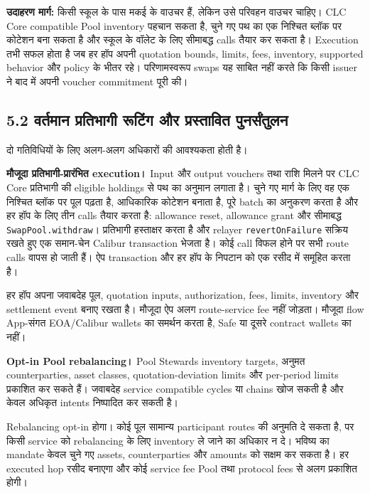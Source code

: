 \documentclass[11pt]{article}
\begin{document}
\textbf{उदाहरण मार्ग:} किसी स्कूल के पास मकई के वाउचर हैं, लेकिन उसे परिवहन वाउचर चाहिए। CLC Core compatible Pool inventory पहचान सकता है, चुने गए पथ का एक निश्चित ब्लॉक पर कोटेशन बना सकता है और स्कूल के वॉलेट के लिए सीमाबद्ध calls तैयार कर सकता है। Execution तभी सफल होता है जब हर हॉप अपनी quotation bounds, limits, fees, inventory, supported behavior और policy के भीतर रहे। परिणामस्वरूप swaps यह साबित नहीं करते कि किसी issuer ने बाद में अपनी voucher commitment पूरी की।

\subsection*{5.2 वर्तमान प्रतिभागी रूटिंग और प्रस्तावित पुनर्संतुलन}

दो गतिविधियों के लिए अलग-अलग अधिकारों की आवश्यकता होती है।

\textbf{मौजूदा प्रतिभागी-प्रारंभित execution।} Input और output vouchers तथा राशि मिलने पर CLC Core प्रतिभागी की eligible holdings से पथ का अनुमान लगाता है। चुने गए मार्ग के लिए वह एक निश्चित ब्लॉक पर पूल पढ़ता है, आधिकारिक कोटेशन बनाता है, पूरे batch का अनुकरण करता है और हर हॉप के लिए तीन calls तैयार करता है: allowance reset, allowance grant और सीमाबद्ध \texttt{SwapPool.withdraw}। प्रतिभागी हस्ताक्षर करता है और relayer \texttt{revertOnFailure} सक्रिय रखते हुए एक समान-चेन Calibur transaction भेजता है। कोई call विफल होने पर सभी route calls वापस हो जाती हैं। ऐप transaction और हर हॉप के निपटान को एक रसीद में समूहित करता है।

हर हॉप अपना जवाबदेह पूल, quotation inputs, authorization, fees, limits, inventory और settlement event बनाए रखता है। मौजूदा ऐप अलग route-service fee नहीं जोड़ता। मौजूदा flow App-संगत EOA/Calibur wallets का समर्थन करता है, Safe या दूसरे contract wallets का नहीं।

\textbf{Opt-in Pool rebalancing।} Pool Stewards inventory targets, अनुमत counterparties, asset classes, quotation-deviation limits और per-period limits प्रकाशित कर सकते हैं। जवाबदेह service compatible cycles या chains खोज सकती है और केवल अधिकृत intents निष्पादित कर सकती है।

Rebalancing opt-in होगा। कोई पूल सामान्य participant routes की अनुमति दे सकता है, पर किसी service को rebalancing के लिए inventory ले जाने का अधिकार न दे। भविष्य का mandate केवल चुने गए assets, counterparties और amounts को सक्षम कर सकता है। हर executed hop रसीद बनाएगा और कोई service fee Pool तथा protocol fees से अलग प्रकाशित होगी।
\end{document}
